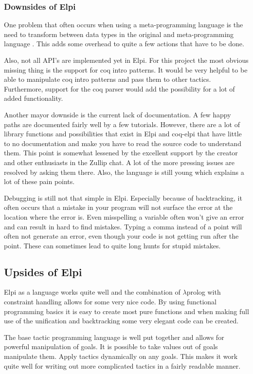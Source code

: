 \documentclass[thesis.tex]{subfiles}
\begin{document}
\subsubsection*{Downsides of Elpi}
One problem that often occurs when using a meta-programming language is the need to transform between data types in the original and meta-programming language \cite*{}. This adds some overhead to quite a few actions that have to be done.

Also, not all API's are implemented yet in Elpi. For this project the most obvious missing thing is the support for coq intro patterns. It would be very helpful to be able to manipulate coq intro patterns and pass them to other tactics. Furthermore, support for the coq parser would add the possibility for a lot of added functionality.

Another mayor downside is the current lack of documentation. A few happy paths are documented fairly well by a few tutorials. However, there are a lot of library functions and possibilities that exist in Elpi and coq-elpi that have little to no documentation and make you have to read the source code to understand them. This point is somewhat lessened by the excellent support by the creator and other enthusiasts in the Zullip chat. A lot of the more pressing issues are resolved by asking them there. Also, the language is still young which explains a lot of these pain points.

Debugging is still not that simple in Elpi. Especially because of backtracking, it often occurs that a mistake in your program will not surface the error at the location where the error is. Even misspelling a variable often won't give an error and can result in hard to find mistakes. Typing a comma instead of a point will often not generate an error, even though your code is not getting run after the point. These can sometimes lead to quite long hunts for stupid mistakes.

\subsection*{Upsides of Elpi}
Elpi as a language works quite well and the combination of $\lambda$prolog with constraint handling allows for some very nice code. By using functional programming basics it is easy to create most pure functions and when making full use of the unification and backtracking some very elegant code can be created.

The base tactic programming language is well put together and allows for powerful manipulation of goals. It is possible to take values out of goals manipulate them. Apply tactics dynamically on any goals. This makes it work quite well for writing out more complicated tactics in a fairly readable manner.
\end{document}
